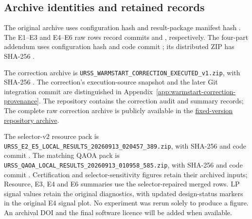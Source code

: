 \documentclass[a4paper,onecolumn,11pt,unpublished]{quantumarticle}
\theoremstyle{remark}
\begin{document}
\subsection{Archive identities and retained records}
The original archive uses configuration hash
\texttt{}
and result-package manifest hash
\texttt{}.
The E1--E3 and E4--E6 raw rows record commits
\texttt{} and
\texttt{}, respectively.  The
four-part addendum uses configuration hash
\texttt{}
and code commit
\texttt{}; its distributed ZIP has
SHA-256
\texttt{}.

The correction archive is
\texttt{URSS\_WARMSTART\_CORRECTION\_EXECUTED\_v1.zip}, with SHA-256
\texttt{}.
The correction's execution-source snapshot and the later Git integration
commit are distinguished in Appendix~\ref{app:warmstart-correction-provenance}.
The repository contains the correction audit and summary records; The complete raw correction archive is publicly available in the
\href{https://github.com/rrocy6/Exact-mixed-locality-representation-selection-for-resource-constrained-QAOA/blob/efaa1ce60fbc9984006472c4b2672578027fac78/delivery/20260913/archives/URSS_WARMSTART_CORRECTION_EXECUTED_v1.zip}{fixed-version repository archive}.

The selector-v2 resource pack is
\nolinkurl{URSS_E2_E5_LOCAL_RESULTS_20260913_020457_389.zip}, with SHA-256
\texttt{}
and code commit
\texttt{}.
The matching QAOA pack is
\nolinkurl{URSS_QAOA_LOCAL_RESULTS_20260913_010958_585.zip}, with SHA-256
\texttt{}
and code commit
\texttt{}.
Certification and selector-sensitivity figures retain their archived inputs;
Resource, E3, E4 and E6 summaries use the selector-repaired merged rows.
LP signal values retain the original diagnostics, with updated design-status
markers in the original E4 signal plot. No experiment was
rerun solely to produce a figure. An archival DOI and
the final software licence will be added when available.
\end{document}
